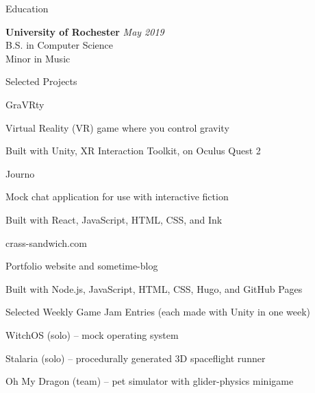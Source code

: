 \documentclass{resume} %
\begin{document}

\begin{rSection}{Education}

\textbf{University of Rochester} \hfill \textit{May 2019} \\ 
B.S. in Computer Science \\
Minor in Music

\end{rSection}


\begin{rSection}{Selected Projects}

\begin{rProject}{GraVRty}
\item Virtual Reality (VR) game where you control gravity
\item Built with Unity, XR Interaction Toolkit, on Oculus Quest 2
\end{rProject}

\begin{rProject}{Journo}
\item Mock chat application for use with interactive fiction
\item Built with React, JavaScript, HTML, CSS, and Ink
\end{rProject}

\begin{rProject}{crass-sandwich.com}
\item Portfolio website and sometime-blog
\item Built with Node.js, JavaScript, HTML, CSS, Hugo, and GitHub Pages
\end{rProject}

\begin{rProject}{Selected Weekly Game Jam Entries (each made with Unity in one week)}
\item WitchOS (solo) – mock operating system
\item Stalaria (solo) – procedurally generated 3D spaceflight runner
\item Oh My Dragon (team) – pet simulator with glider-physics minigame
\end{rProject}
\end{rSection}
\end{document}
